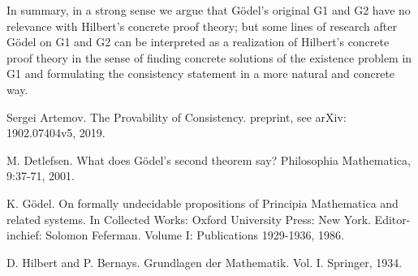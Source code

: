 \documentclass[bsl,meeting]{asl}
\begin{document}
In summary, in a strong sense we argue that G\"{o}del's original {\sf G1} and {\sf G2} have no
relevance with Hilbert's concrete proof theory; but some lines of research after G\"{o}del on {\sf G1} and {\sf G2} can be interpreted as a realization of Hilbert's concrete proof theory in the sense of finding concrete solutions of the existence problem in {\sf G1} and formulating the consistency statement in a more natural and concrete way.



\begin{thebibliography}{100}

Sergei Artemov. The Provability of Consistency. preprint, see arXiv:
1902.07404v5, 2019.


 M. Detlefsen. What does G\"{o}del's second theorem say? Philosophia Mathematica,
9:37-71, 2001.

 K. G\"{o}del. On formally undecidable propositions of Principia Mathematica and
related systems. In Collected Works: Oxford University Press: New York. Editor-inchief:
Solomon Feferman. Volume I: Publications 1929-1936, 1986.

 D. Hilbert and P. Bernays. Grundlagen der Mathematik. Vol. I. Springer, 1934.
\end{thebibliography}
\end{document}
